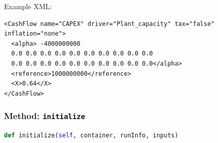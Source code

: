Example XML:
\begin{lstlisting}[style=XML,morekeywords={subType,ModuleToLoad}]
<CashFlow name="CAPEX" driver="Plant_capacity" tax="false" inflation="none">
  <alpha> -4000000000
  0.0 0.0 0.0 0.0 0.0 0.0 0.0 0.0 0.0 0.0
  0.0 0.0 0.0 0.0 0.0 0.0 0.0 0.0 0.0 0.0</alpha>
  <reference>1000000000</reference>
  <X>0.64</X> 
</CashFlow>
\end{lstlisting}

\subsubsection{Method: \texttt{initialize}}
\label{subsubsec:externalInitializeExternalModelPlugin}
\begin{lstlisting}[language=python]
def initialize(self, container, runInfo, inputs)
\end{lstlisting}

